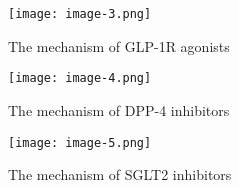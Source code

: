\documentclass{article}
\begin{document}
\begin{figure}[H]
    \centering
    \caption{The mechanism of GLP-1R agonists}
    \texttt{[image: image-3.png]}
\end{figure}

\begin{figure}[H]
    \centering
    \caption{The mechanism of DPP-4 inhibitors}
    \texttt{[image: image-4.png]}
\end{figure}

\begin{figure}[H]
    \centering
    \caption{The mechanism of SGLT2 inhibitors}
    \texttt{[image: image-5.png]}
\end{figure}
\end{document}
